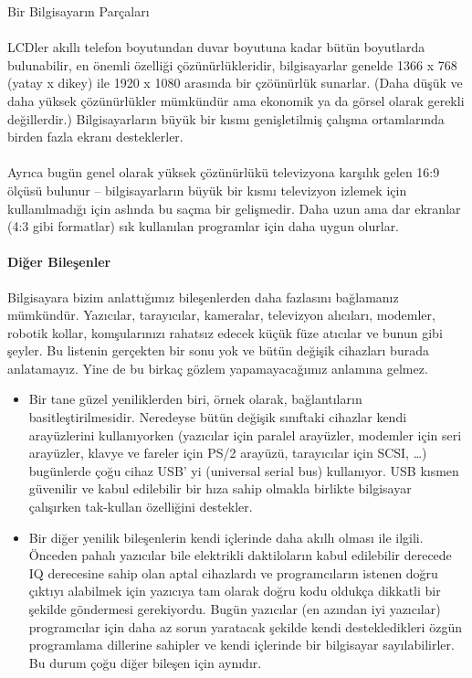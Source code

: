\documentclass[10pt,a5paper]{book}
\begin{document}
\begin{section}{Bir Bilgisayarın Parçaları}
\paragraph{}{LCDler akıllı telefon boyutundan duvar boyutuna kadar bütün boyutlarda bulunabilir, en önemli özelliği çözünürlükleridir, bilgisayarlar genelde 1366 x 768 (yatay x dikey) ile 1920 x 1080 arasında bir çzöünürlük sunarlar. (Daha düşük ve daha yüksek çözünürlükler mümkündür ama ekonomik ya da görsel olarak gerekli değillerdir.) Bilgisayarların büyük bir kısmı genişletilmiş çalışma ortamlarında birden fazla ekranı desteklerler.}
\paragraph{}{Ayrıca bugün genel olarak yüksek çözünürlükü televizyona karşılık gelen 16:9 ölçüsü bulunur – bilgisayarların büyük bir kısmı televizyon izlemek için kullanılmadığı için aslında bu saçma bir gelişmedir. Daha uzun ama dar ekranlar (4:3 gibi formatlar) sık kullanılan programlar için daha uygun olurlar.}
\paragraph{Diğer Bileşenler}{Bilgisayara bizim anlattığımız bileşenlerden daha fazlasını bağlamanız mümkündür. Yazıcılar, tarayıcılar, kameralar, televizyon alıcıları, modemler, robotik kollar, komşularınızı rahatsız edecek küçük füze atıcılar ve bunun gibi şeyler. Bu listenin gerçekten bir sonu yok ve bütün değişik cihazları burada anlatamayız. Yine de bu birkaç gözlem yapamayacağımız anlamına gelmez.}
\begin{itemize}
 \item Bir tane güzel yeniliklerden biri, örnek olarak, bağlantıların basitleştirilmesidir. Neredeyse bütün değişik sınıftaki cihazlar kendi arayüzlerini kullanıyorken (yazıcılar için paralel arayüzler, modemler için seri arayüzler, klavye ve fareler için PS/2 arayüzü, tarayıcılar için SCSI, …) bugünlerde çoğu cihaz USB' yi (universal serial bus) kullanıyor. USB kısmen güvenilir ve kabul edilebilir bir hıza sahip olmakla birlikte bilgisayar çalışırken tak-kullan özelliğini destekler.
 \item Bir diğer yenilik bileşenlerin kendi içlerinde daha akıllı olması ile ilgili. Önceden pahalı yazıcılar bile elektrikli daktiloların kabul edilebilir derecede IQ derecesine sahip olan aptal cihazlardı ve programcıların istenen doğru çıktıyı alabilmek için yazıcıya tam olarak doğru kodu oldukça dikkatli bir şekilde göndermesi gerekiyordu. Bugün yazıcılar (en azından iyi yazıcılar) programcılar için daha az sorun yaratacak şekilde kendi destekledikleri özgün programlama dillerine sahipler ve kendi içlerinde bir bilgisayar sayılabilirler. Bu durum çoğu diğer bileşen için aynıdır.
\end{itemize}

\end{section}
\end{document}
